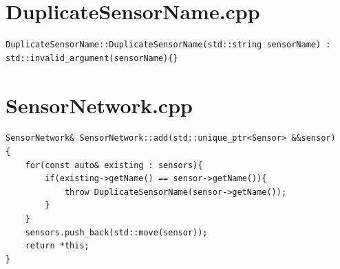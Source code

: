 \documentclass[8pt,twocolumn]{extarticle}
\begin{document}
\section*{DuplicateSensorName.cpp}
\begin{lstlisting}
DuplicateSensorName::DuplicateSensorName(std::string sensorName) : std::invalid_argument(sensorName){}
\end{lstlisting}

\section*{SensorNetwork.cpp}
\begin{lstlisting}
SensorNetwork& SensorNetwork::add(std::unique_ptr<Sensor> &&sensor)
{
	for(const auto& existing : sensors){
		if(existing->getName() == sensor->getName()){
			throw DuplicateSensorName(sensor->getName());
		}
	}
	sensors.push_back(std::move(sensor));
	return *this;
}
\end{lstlisting}
\end{document}
